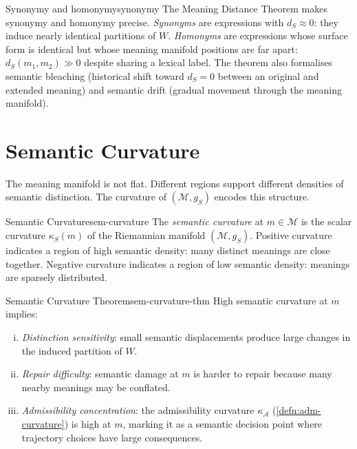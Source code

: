 \documentclass[12pt,twoside,openright]{book}
\newcommand{\adm}{\mathcal{A}}
\begin{document}
\begin{remark}{Synonymy and homonymy}{synonymy}
  The Meaning Distance Theorem makes synonymy and
  homonymy precise.
  \emph{Synonyms} are expressions with $d_S \approx 0$:
  they induce nearly identical partitions of $W$.
  \emph{Homonyms} are expressions whose surface form
  is identical but whose meaning manifold positions are
  far apart: $d_S(m_1, m_2) \gg 0$ despite sharing
  a lexical label.
  The theorem also formalises semantic bleaching
  (historical shift toward $d_S = 0$ between an original
  and extended meaning) and semantic drift
  (gradual movement through the meaning manifold).
\end{remark}

\section{Semantic Curvature}

The meaning manifold is not flat. Different regions
support different densities of semantic distinction.
The curvature of $(\mathcal{M}, g_S)$ encodes this
structure.

\begin{definition}{Semantic Curvature}{sem-curvature}
  The \emph{semantic curvature} at $m \in \mathcal{M}$
  is the scalar curvature $\kappa_S(m)$ of the
  Riemannian manifold $(\mathcal{M}, g_S)$.
  Positive curvature indicates a region of high
  semantic density: many distinct meanings are close
  together.
  Negative curvature indicates a region of low semantic
  density: meanings are sparsely distributed.
\end{definition}

\begin{theorem}{Semantic Curvature Theorem}{sem-curvature-thm}
  High semantic curvature at $m$ implies:
  \begin{enumerate}[(i)]
    \item \emph{Distinction sensitivity}: small
          semantic displacements produce large changes
          in the induced partition of $W$.
    \item \emph{Repair difficulty}: semantic damage
          at $m$ is harder to repair because many
          nearby meanings may be conflated.
    \item \emph{Admissibility concentration}: the
          admissibility curvature $\kappa_\adm$
          (\cref{defn:adm-curvature}) is high at $m$,
          marking it as a semantic decision point
          where trajectory choices have large
          consequences.
  \end{enumerate}
\end{theorem}
\end{document}
